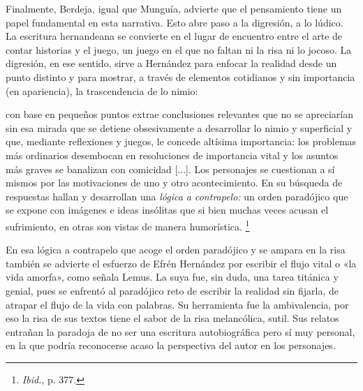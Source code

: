 \documentclass[14pt,twoside,final]{extbook} %
\let\oldfootnote\footnote
\renewcommand\footnote[1]{%
\oldfootnote{\hspace{1mm}#1}}
\begin{document}
Finalmente, Berdeja, igual que Munguía, advierte que el pensamiento tiene un papel fundamental en esta narrativa. Esto abre paso a la digresión, a lo lúdico. La escritura hernandeana se convierte en el lugar de encuentro entre el arte de contar historias y el juego, un juego en el que no faltan ni la risa ni lo jocoso. La digresión, en ese sentido, sirve a Hernández para enfocar la realidad desde un punto distinto y para mostrar, a través de elementos cotidianos y sin importancia (en apariencia), la trascendencia de lo nimio:
\begin{quoting}
con base en pequeños puntos extrae conclusiones relevantes que no se apreciarían sin esa mirada que se detiene obsesivamente a desarrollar lo nimio y superficial y que, mediante reflexiones y juegos, le concede altísima importancia: los problemas más ordinarios desembocan en resoluciones de importancia vital y los asuntos más graves se banalizan con comicidad [...]. Los personajes se cuestionan a sí mismos por las motivaciones de uno y otro acontecimiento. En su búsqueda de respuestas hallan y desarrollan una \emph{lógica a contrapelo:} un orden paradójico que se expone con imágenes e ideas insólitas que si bien muchas veces acusan el sufrimiento, en otras son vistas de manera humorística.\footnote{\emph{Ibid.}, p. 377.}
\end{quoting}
En esa lógica a contrapelo que acoge el orden paradójico y se ampara en la risa también se advierte el esfuerzo de Efrén Hernández por escribir el flujo vital o «la vida amorfa», como señala Lemus. La suya fue, sin duda, una tarea titánica y genial, pues se enfrentó al paradójico reto de escribir la realidad sin fijarla, de atrapar el flujo de la vida con palabras. Su herramienta fue la ambivalencia, por eso la risa de sus textos tiene el sabor de la risa melancólica, sutil. Sus relatos entrañan la paradoja de no ser una escritura autobiográfica pero sí muy personal, en la que podría reconocerse acaso la perspectiva del autor en los personajes.
\end{document}
